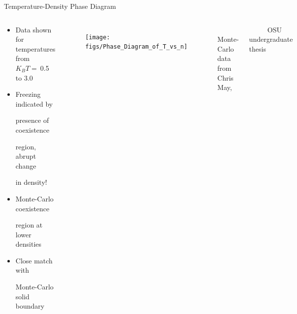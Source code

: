 \documentclass{beamer}
\begin{document}
\begin{frame}{Temperature-Density Phase Diagram}
\begin{columns}
	    \vspace{-2em}
        \begin{block}{}
            \begin{itemize}
              \item Data shown for temperatures from $K_BT=~$0.5 to 3.0
              \item Freezing indicated by 
            
               presence of coexistence
            
               region, abrupt change 
            
               in density!
              \item Monte-Carlo coexistence 
              
              region at lower densities
              
              \item Close match with 
              
              Monte-Carlo solid boundary
            \end{itemize}
            \end{block}
    \begin{figure}
        \centering
        \texttt{[image: figs/Phase\_Diagram\_of\_T\_vs\_n]}\\
    \end{figure}        
    \vspace{-1em}
    \footnotesize $~~~~~~~~~~~~$Monte-Carlo data from Chris May, 
    
     $~~~~~~~~~~~~$OSU undergraduate thesis
     \normalsize
     \end{columns}
\end{frame}
\end{document}
